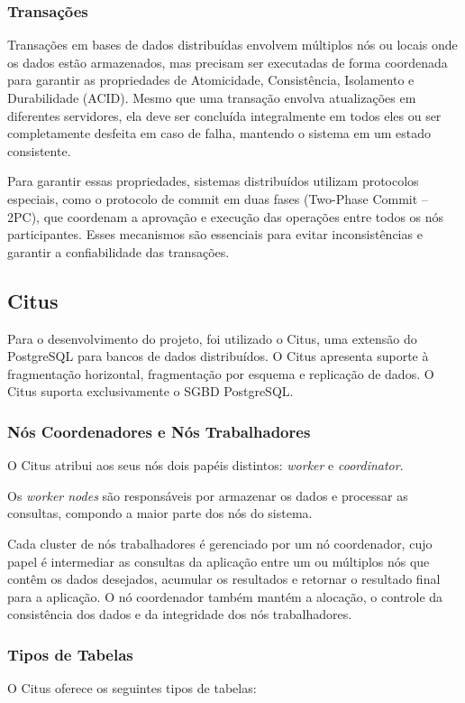 \subsubsection{Transações}
Transações em bases de dados distribuídas envolvem múltiplos nós ou locais onde os dados estão armazenados, mas precisam ser executadas de forma coordenada para garantir as propriedades de Atomicidade, Consistência, Isolamento e Durabilidade (ACID). Mesmo que uma transação envolva atualizações em diferentes servidores, ela deve ser concluída integralmente em todos eles ou ser completamente desfeita em caso de falha, mantendo o sistema em um estado consistente.

Para garantir essas propriedades, sistemas distribuídos utilizam protocolos especiais, como o protocolo de commit em duas fases (Two-Phase Commit – 2PC), que coordenam a aprovação e execução das operações entre todos os nós participantes. Esses mecanismos são essenciais para evitar inconsistências e garantir a confiabilidade das transações.

\subsection{Citus}
Para o desenvolvimento do projeto, foi utilizado o Citus, uma extensão do PostgreSQL para bancos de dados distribuídos. O Citus apresenta suporte à fragmentação horizontal, fragmentação por esquema e replicação de dados. O Citus suporta exclusivamente o SGBD PostgreSQL.

\subsubsection{Nós Coordenadores e Nós Trabalhadores}
O Citus atribui aos seus nós dois papéis distintos: \textit{worker} e \textit{coordinator}.

Os \textit{worker nodes} são responsáveis por armazenar os dados e processar as consultas, compondo a maior parte dos nós do sistema.

Cada cluster de nós trabalhadores é gerenciado por um nó coordenador, cujo papel é intermediar as consultas da aplicação entre um ou múltiplos nós que contêm os dados desejados, acumular os resultados e retornar o resultado final para a aplicação. O nó coordenador também mantém a alocação, o controle da consistência dos dados e da integridade dos nós trabalhadores.

\subsubsection{Tipos de Tabelas}
O Citus oferece os seguintes tipos de tabelas:

